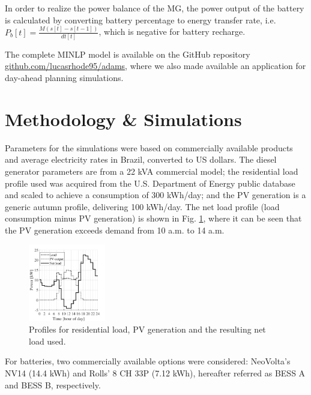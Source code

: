 \documentclass{ieeeaccess}
\begin{document}
    In order to realize the power balance of the \ac{MG}, the power output of the battery is calculated by converting battery percentage to energy transfer rate, i.e. $P_b[t] = \frac{M(s[t]-s[t-1])}{dt[t]}$, which is negative for battery recharge.

    The complete MINLP model is available on the GitHub repository \href{https://github.com/lucasrhode95/adams}{github.com/lucasrhode95/adams}, where we also made available an application for day-ahead planning simulations.

    \section{Methodology \& Simulations}
    Parameters for the simulations were based on commercially available products and average electricity rates in Brazil, converted to US dollars. The diesel generator parameters are from a 22 kVA commercial model; the residential load profile used was acquired from the U.S. Department of Energy public database \cite{DOE2013} and scaled to achieve a consumption of 300 kWh/day; and the \ac{PV} generation is a generic autumn profile, delivering 100 kWh/day. The net load profile (load consumption minus \ac{PV} generation) is shown in Fig. \ref{fig:net-load}, where it can be seen that the \ac{PV} generation exceeds demand from 10 a.m. to 14 a.m.
    \begin{figure}[htbp]
        \centering
        \includegraphics[width=0.3\textwidth]{figures/net_load.pdf}
        \caption{Profiles for residential load, \ac{PV} generation and the resulting net load used.}
        \label{fig:net-load}
    \end{figure}

    For batteries, two commercially available options were considered: NeoVolta's NV14 (14.4 kWh) and Rolls' 8 CH 33P (7.12 kWh), hereafter referred as \ac{BESS} A and \ac{BESS} B, respectively.
\end{document}
